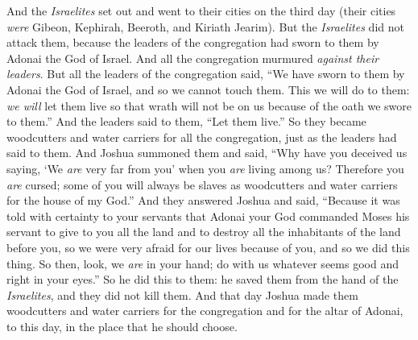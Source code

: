 \begin{biblechapter}
\verse And the \textit{Israelites} set out and went to their cities on the third day (their cities \textit{were} Gibeon, Kephirah, Beeroth, and Kiriath Jearim).
\verse But the \textit{Israelites} did not attack them, because the leaders of the congregation had sworn to them by Adonai the God of Israel. And all the congregation murmured \textit{against their leaders}.
\verse But all the leaders of the congregation said, “We have sworn to them by Adonai the God of Israel, and so we cannot touch them.
\verse This we will do to them: \textit{we will} let them live so that wrath will not be on us because of the oath we swore to them.”
\verse And the leaders said to them, “Let them live.” So they became woodcutters and water carriers for all the congregation, just as the leaders had said to them.
\verse And Joshua summoned them and said, “Why have you deceived us saying, ‘We \textit{are} very far from you’ when you \textit{are} living among us?
\verse Therefore you \textit{are} cursed; some of you will always be slaves as woodcutters and water carriers for the house of my God.”
\verse And they answered Joshua and said, “Because it was told with certainty to your servants that Adonai your God commanded Moses his servant to give to you all the land and to destroy all the inhabitants of the land before you, so we were very afraid for our lives because of you, and so we did this thing.
\verse So then, look, we \textit{are} in your hand; do with us whatever seems good and right in your eyes.”
\verse So he did this to them: he saved them from the hand of the \textit{Israelites}, and they did not kill them.
\verse And that day Joshua made them woodcutters and water carriers for the congregation and for the altar of Adonai, to this day, in the place that he should choose.
\end{biblechapter}

